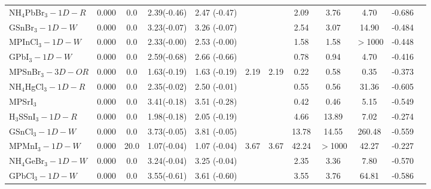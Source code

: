 \begin{table*}
\begin{tabular*}{0.98\textwidth}{@{\extracolsep{\fill}}l c c c c c c c c c c c}
 NH$_4$PbBr$_3-1D-R$&      0.000&        0.0&       2.39(-0.46)&            2.47  (-0.47)&           &                &            2.09&            3.76&            4.70&     -0.686\\
      GSnBr$_3-1D-W$&      0.000&        0.0&       3.23(-0.07)&            3.26  (-0.07)&           &                &            2.54&            3.07&           14.90&     -0.484\\
     MPInCl$_3-1D-W$&      0.000&        0.0&       2.33(-0.00)&            2.53  (-0.00)&           &                &            1.58&            1.58&         $>$1000&     -0.448\\
       GPbI$_3-1D-W$&      0.000&        0.0&       2.59(-0.68)&            2.66  (-0.66)&           &                &            0.78&            0.94&            4.70&     -0.416\\
    MPSnBr$_3-3D-OR$&      0.000&        0.0&       1.63(-0.19)&            1.63  (-0.19)&       2.19&            2.19&            0.22&            0.58&            0.35&     -0.373\\
 NH$_4$HgCl$_3-1D-R$&      0.000&        0.0&       2.35(-0.02)&            2.50  (-0.01)&           &                &            0.55&            0.56&           31.36&     -0.605\\
           MPSrI$_3$&      0.000&        0.0&       3.41(-0.18)&            3.51  (-0.28)&           &                &            0.42&            0.46&            5.15&     -0.549\\
  H$_3$SSnI$_3-1D-R$&      0.000&        0.0&       1.98(-0.18)&            2.05  (-0.19)&           &                &            4.66&           13.89&            7.02&     -0.274\\
      GSnCl$_3-1D-W$&      0.000&        0.0&       3.73(-0.05)&            3.81  (-0.05)&           &                &           13.78&           14.55&          260.48&     -0.559\\
      MPMnI$_3-1D-W$&      0.000&       20.0&       1.07(-0.04)&            1.07  (-0.04)&       3.67&            3.67&           42.24&         $>$1000&           42.27&     -0.227\\
 NH$_4$GeBr$_3-1D-W$&      0.000&        0.0&       3.24(-0.04)&            3.25  (-0.04)&           &                &            2.35&            3.36&            7.80&     -0.570\\
      GPbCl$_3-1D-W$&      0.000&        0.0&       3.55(-0.61)&            3.61  (-0.60)&           &                &            3.55&            3.76&           64.81&     -0.586\\

\end{tabular*}
\end{table*}
